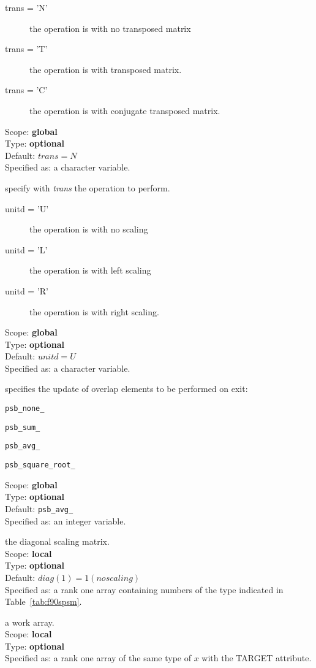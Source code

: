\begin{description}
\begin{description}
\item[trans = 'N'] the operation is with no transposed matrix
\item[trans = 'T'] the operation is with transposed matrix.
\item[trans = 'C'] the operation is with conjugate transposed matrix.
\end{description}
Scope: {\bf global} \\
Type: {\bf optional}\\	
Default: $trans = N$\\	
Specified as: a character variable.
\item[unitd] specify with {\em trans} the operation to perform.
\begin{description}
\item[unitd = 'U'] the operation is with no scaling
\item[unitd = 'L'] the operation is with left scaling
\item[unitd = 'R'] the operation is with right scaling.
\end{description}
Scope: {\bf global} \\
Type: {\bf optional}\\	
Default: $unitd = U$\\	
Specified as: a character variable.
\item[choice] specifies the update of overlap elements to be performed
  on exit:
\begin{description}
\item \verb|psb_none_|
\item \verb|psb_sum_|
\item \verb|psb_avg_|
\item \verb|psb_square_root_|
\end{description}
Scope: {\bf global} \\
Type: {\bf optional}\\	
Default: \verb|psb_avg_|\\	
Specified as: an integer variable.
\item[diag] the diagonal scaling matrix.\\
Scope: {\bf local} \\
Type: {\bf optional}\\	
Default: $diag(1) = 1 (no scaling)$\\	
Specified as: a rank one  array containing numbers of the type
indicated in Table~\ref{tab:f90spsm}.
\item[work] a work array. \\
Scope: {\bf local} \\
Type: {\bf optional}\\	
Specified as: a rank one array of the same type of $x$ with the
TARGET attribute. 


\end{description}
